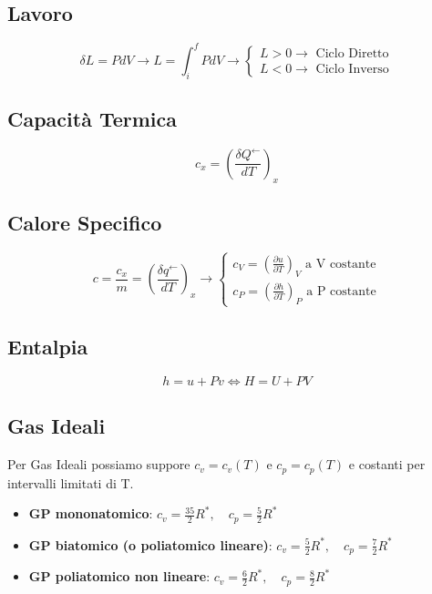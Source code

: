 \documentclass[a4paper]{report}
\begin{document}
\subsection*{Lavoro}
\[
  \boxed{\delta L = PdV} \longrightarrow \boxed{L = \int_i^f PdV} \longrightarrow \left\{\begin{array}{l}
      L>0 \rightarrow \text{ Ciclo Diretto}\\
      L<0 \rightarrow \text{ Ciclo Inverso}
  \end{array}\right.  
\]

\subsection*{Capacità Termica}
\[
  \boxed{c_x = \left(\frac{\delta Q^\leftarrow}{dT}\right)_x}
\]

\subsection*{Calore Specifico}
\[
  \boxed{c = \frac{c_x}{m}=\left(\frac{\delta q^\leftarrow}{dT}\right)_x} \longrightarrow \left\{\begin{array}{l}
    \boxed{c_V = \left(\frac{\partial u}{\partial T}\right)_V }\text{ a V costante}\\
    \boxed{c_P = \left(\frac{\partial h}{\partial T}\right)_P }\text{ a P costante}    
  \end{array}\right.  
\]

\subsection*{Entalpia}
\[
  \boxed{h = u + Pv} \iff \boxed{H = U+PV}
\]

\subsection*{Gas Ideali}
Per Gas Ideali possiamo suppore $c_v=c_v(T)$ e $c_p=c_p(T)$ e costanti per intervalli limitati di T.
\begin{itemize}
    \item \textbf{GP mononatomico}: $\boxed{c_v = \frac{35}{2}R^*, \quad c_p = \frac{5}{2}R^*}$
    \item \textbf{GP biatomico (o poliatomico lineare)}: $\boxed{c_v = \frac{5}{2}R^*, \quad c_p = \frac{7}{2}R^*}$
    \item \textbf{GP poliatomico non lineare}: $\boxed{c_v = \frac{6}{2}R^*, \quad c_p = \frac{8}{2}R^*}$
\end{itemize}
\end{document}
